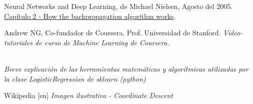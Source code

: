 \documentclass[a4paper]{article}
\begin{document}


\pagestyle{fancy}
\lhead{\slshape \leftmark}
\chead{\scalebox{0.1}{asasasa}}
\renewcommand{\headrulewidth}{0.4pt}
\renewcommand{\footrulewidth}{0.4pt}

  \tableofcontents
  \clearpage

  


  

  

  

  



\clearpage
\begin{thebibliography}{50}

 Neural Networks and Deep Learning, de Michael Nielsen, Agosto del 2005. \href{Capítulo 2}{Capítulo 2 - How the backpropagation algorithm works}.

	Andrew NG, Co-fundador de Coursera, Prof. Universidad de Stanford. \textit{Video-tutoriales de curso de Machine Learning de Coursera.}

	\href{http://scikit-learn.org/stable/modules/linear\char`_model.html\#logistic-regression}  \\ \textit{Breve explicación de las herramientas matemáticas y algorítmicas utilizadas por la clase LogisticRegression de sklearn (python)}

	Wikipedia [en] \textit{Imagen ilustrativa - Coordinate Descent}
\end{thebibliography}
\end{document}
